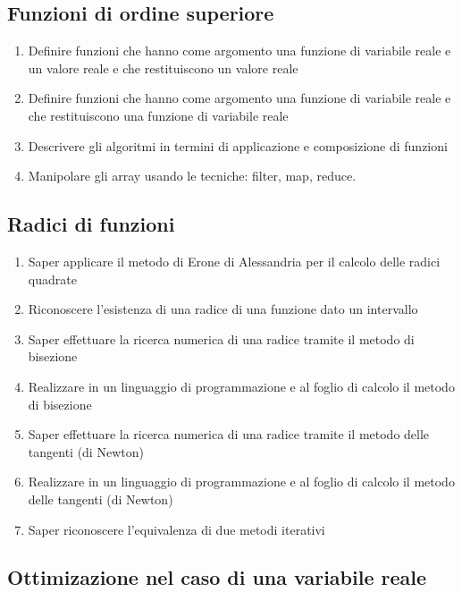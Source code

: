 \documentclass{easychair}
\begin{document}
\subsection[Funzioni di ordine superiore]{Funzioni di ordine superiore}

\begin{enumerate}
  \item
    Definire funzioni che hanno come argomento una funzione di variabile
    reale e un valore reale e che restituiscono un valore reale
  \item
    Definire funzioni che hanno come argomento una funzione di variabile
    reale e che restituiscono una funzione di variabile reale
  \item
    Descrivere gli algoritmi in termini di applicazione e composizione di funzioni
  \item
    Manipolare gli array usando le tecniche: filter, map, reduce.
\end{enumerate}

\subsection[Radici]{Radici di funzioni}

\begin{enumerate}
  \item Saper applicare il metodo di Erone di Alessandria per il calcolo delle radici quadrate
  \item
    Riconoscere l'esistenza di una radice di una funzione dato un intervallo
  \item
    Saper effettuare la ricerca numerica di una radice tramite il metodo
    di bisezione
  \item
    Realizzare in un linguaggio di programmazione e al foglio di calcolo
    il metodo di bisezione
    \item
    Saper effettuare la ricerca numerica di una radice tramite il metodo
    delle tangenti (di Newton)
  \item
    Realizzare in un linguaggio di programmazione e al foglio di calcolo
    il metodo delle tangenti (di Newton)
  \item
    Saper riconoscere l'equivalenza di due metodi iterativi
\end{enumerate}

\subsection[Ottimizzazione]{Ottimizazione nel caso di una variabile reale}
\end{document}
